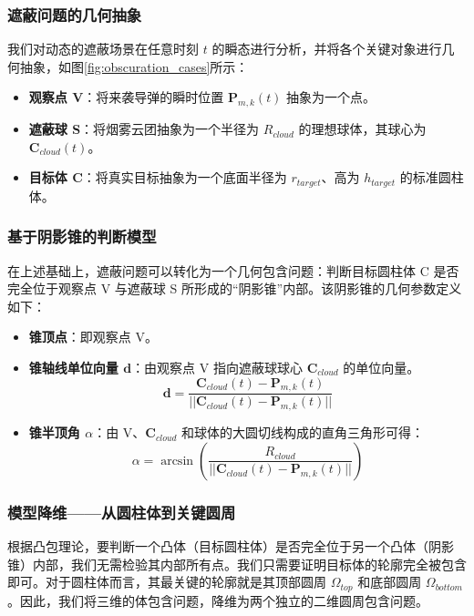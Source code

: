 \documentclass[fontset=SimSun]{ctexart}
\begin{document}
\subsubsection{遮蔽问题的几何抽象}
我们对动态的遮蔽场景在任意时刻 $t$ 的瞬态进行分析，并将各个关键对象进行几何抽象，如图\ref{fig:obscuration_cases}所示：
\begin{itemize}
    \item \textbf{观察点 V}：将来袭导弹的瞬时位置 $\mathbf{P}_{m,k}(t)$ 抽象为一个点。
    \item \textbf{遮蔽球 S}：将烟雾云团抽象为一个半径为 $R_{cloud}$ 的理想球体，其球心为 $\mathbf{C}_{cloud}(t)$。
    \item \textbf{目标体 C}：将真实目标抽象为一个底面半径为 $r_{target}$、高为 $h_{target}$ 的标准圆柱体。
\end{itemize}

\subsubsection{基于阴影锥的判断模型}
在上述基础上，遮蔽问题可以转化为一个几何包含问题：判断目标圆柱体 C 是否完全位于观察点 V 与遮蔽球 S 所形成的“阴影锥”内部。该阴影锥的几何参数定义如下：
\begin{itemize}
    \item \textbf{锥顶点}：即观察点 V。
    \item \textbf{锥轴线单位向量 $\mathbf{d}$}：由观察点 V 指向遮蔽球球心 $\mathbf{C}_{cloud}$ 的单位向量。
    \begin{equation}
    \mathbf{d} = \frac{\mathbf{C}_{cloud}(t) - \mathbf{P}_{m,k}(t)}{||\mathbf{C}_{cloud}(t) - \mathbf{P}_{m,k}(t)||}
    \end{equation}
    \item \textbf{锥半顶角 $\alpha$}：由 V、$\mathbf{C}_{cloud}$ 和球体的大圆切线构成的直角三角形可得：
    \begin{equation}
    \alpha = \arcsin\left(\frac{R_{cloud}}{||\mathbf{C}_{cloud}(t) - \mathbf{P}_{m,k}(t)||}\right)
    \end{equation}
\end{itemize}

\subsubsection{模型降维——从圆柱体到关键圆周}
根据凸包理论，要判断一个凸体（目标圆柱体）是否完全位于另一个凸体（阴影锥）内部，我们无需检验其内部所有点。我们只需要证明目标体的轮廓完全被包含即可。对于圆柱体而言，其最关键的轮廓就是其顶部圆周 $\Omega_{top}$ 和底部圆周 $\Omega_{bottom}$。因此，我们将三维的体包含问题，降维为两个独立的二维圆周包含问题。
\end{document}
